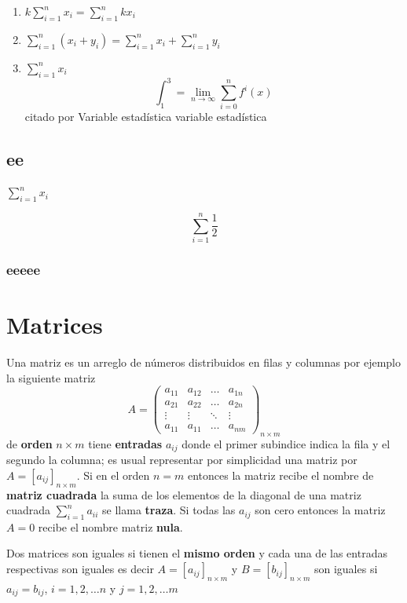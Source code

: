 \documentclass[
  11pt,
]{krantz}
\providecommand{\tightlist}{%
  \setlength{\itemsep}{0pt}\setlength{\parskip}{0pt}}
\theoremstyle{definition}
\theoremstyle{definition}
\theoremstyle{definition}
\theoremstyle{definition}
\theoremstyle{remark}
\begin{document}
\begin{enumerate}
\def\labelenumi{\arabic{enumi}.}
\tightlist
\item
  \(k\sum_{i=1}^nx_i=\sum_{i=1}^nkx_i\)
\item
  \(\sum_{i=1}^n\left(x_i+y_i\right)=\sum_{i=1}^nx_i+\sum_{i=1}^ny_i\)
\item
  \(\sum_{i=1}^nx_i\)
  \[\int_1^3=\lim_{n\to \infty}\sum_{i=0}^{n}f^i(x)\]
  citado por \citep{xie2015}
  Variable estadística variable estadística
\end{enumerate}

\hypertarget{ee}{%
\section{ee}\label{ee}}

\(\sum_{i=1}^nx_i\)

\[
\sum_{i=1}^n \frac{1}{2}
\]

\hypertarget{eeeee}{%
\subsection{eeeee}\label{eeeee}}

\hypertarget{matrices}{%
\chapter{Matrices}\label{matrices}}

Una matriz es un arreglo de números distribuidos en filas y columnas por ejemplo la siguiente matriz
\[A=\begin{pmatrix}
a_{11}&a_{12}&\ldots&a_{1n}\\
a_{21}&a_{22}&\ldots&a_{2n}\\
\vdots & \vdots & \ddots &\vdots \\
a_{11}&a_{11}&\ldots&a_{nm}
\end{pmatrix}_{n\times m}\]
de \textbf{orden} \(n\times m\) tiene \textbf{entradas} \(a_{ij}\) donde el primer subindice indica la fila y el segundo la columna; es usual representar por simplicidad una matriz por \(A=[a_{ij}]_{n\times m}\). Si en el orden \(n=m\) entonces la matriz recibe el nombre de \textbf{matriz cuadrada} la suma de los elementos de la diagonal de una matriz cuadrada \(\sum_{i=1}^na_{ii}\) se llama \textbf{traza}. Si todas las \(a_{ij}\) son cero entonces la matriz \(A=0\) recibe el nombre matriz \textbf{nula}.

Dos matrices son iguales si tienen el \textbf{mismo orden} y cada una de las entradas respectivas son iguales es decir \(A=[a_{ij}]_{n\times m}\) y \(B=[b_{ij}]_{n\times m}\) son iguales si \(a_{ij}=b_{ij}\), \(i=1,2,\ldots n\) y \(j=1,2,\ldots m\)
\end{document}
